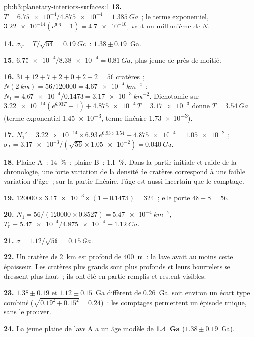 \begin{solution}{pb:b3:planetary-interiors-surfaces:1}
\textbf{13.} $T = \num{6.75e-4}/\num{4.875e-4} = \qty{1.385}{Ga}$~; le
terme exponentiel, $\num{3.22e-14}(e^{9.6} - 1) = \num{4.7e-10}$, vaut un
millionième de $N_1$.

\textbf{14.} $\sigma_T = T/\sqrt{54} = \qty{0.19}{Ga}$~: $1.38 \pm 0.19$~Ga.

\textbf{15.} $\num{6.75e-4}/\num{8.38e-4} = \qty{0.81}{Ga}$, plus jeune de
près de moitié.

\textbf{16.} $31 + 12 + 7 + 2 + 0 + 2 + 2 = 56$ cratères~; $N(\qty{2}{km}) =
56/120000 = \qty{4.67e-4}{km^{-2}}$~; $N_1 = \num{4.67e-4}/0.1473 =
\qty{3.17e-3}{km^{-2}}$. Dichotomie sur $\num{3.22e-14}(e^{6.93T} - 1) +
\num{4.875e-4}\,T = \num{3.17e-3}$ donne $T = \qty{3.54}{Ga}$ (terme
exponentiel \num{1.45e-3}, terme linéaire \num{1.73e-3}).

\textbf{17.} $N_1' = \num{3.22e-14}\times6.93\,e^{6.93\times3.54} +
\num{4.875e-4} = \num{1.05e-2}$~; $\sigma_T = \num{3.17e-3}/(\sqrt{56}\times
\num{1.05e-2}) = \qty{0.040}{Ga}$.

\textbf{18.} Plaine A~: \qty{14}{\percent}~; plaine B~: \qty{1.1}{\percent}. Dans
la partie initiale et raide de la chronologie, une forte variation de la densité
de cratères correspond à une faible variation d'âge~; sur la partie linéaire,
l'âge est aussi incertain que le comptage.

\textbf{19.} $120000\times\num{3.17e-3}\times(1 - 0.1473) = 324$~; elle
porte $48 + 8 = 56$.

\textbf{20.} $N_1 = 56/(120000\times0.8527) = \qty{5.47e-4}{km^{-2}}$,
$T_r = \num{5.47e-4}/\num{4.875e-4} = \qty{1.12}{Ga}$.

\textbf{21.} $\sigma = 1.12/\sqrt{56} = \qty{0.15}{Ga}$.

\textbf{22.} Un cratère de \qty{2}{km} est profond de \qty{400}{m}~: la lave
avait au moins cette épaisseur. Les cratères plus grands sont plus profonds
et leurs bourrelets se dressent plus haut~; ils ont été en partie remplis et restent visibles.

\textbf{23.} $1.38 \pm 0.19$ et $1.12 \pm 0.15$~Ga diffèrent de \qty{0.26}{Ga},
soit environ un écart type combiné ($\sqrt{0.19^2 + 0.15^2} = 0.24$)~: les
comptages permettent un épisode unique, sans le prouver.

\textbf{24.} La jeune plaine de lave A a un âge modèle de
\textbf{1.4~Ga} ($1.38 \pm 0.19$~Ga).
\end{solution}
